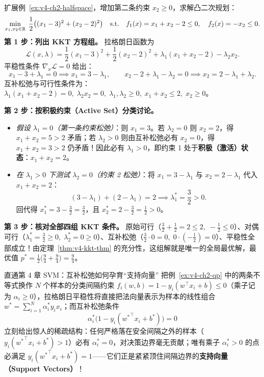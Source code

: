\begin{example}\label{ex:v4-ch2-qp}
扩展例~\ref{ex:v4-ch2-halfspace}，增加第二条约束 $x_2 \ge 0$，求解凸二次规划：
\[
  \min_{x_1, x_2 \in \mathbb{R}}\; \frac{1}{2}\big((x_1 - 3)^2 + (x_2 - 2)^2\big)
  \quad\text{s.t.}\quad f_1(x) = x_1 + x_2 - 2 \le 0,\quad f_2(x) = -x_2 \le 0.
\]
\textbf{第 1 步：列出 KKT 方程组。} 拉格朗日函数为
\[
  \mathcal{L}(x, \lambda) = \frac{1}{2}(x_1 - 3)^2 + \frac{1}{2}(x_2 - 2)^2 + \lambda_1(x_1 + x_2 - 2) - \lambda_2 x_2.
\]
平稳性条件 $\nabla_x \mathcal{L} = 0$ 给出：
\[
  x_1 - 3 + \lambda_1 = 0 \implies x_1 = 3 - \lambda_1, \qquad
  x_2 - 2 + \lambda_1 - \lambda_2 = 0 \implies x_2 = 2 - \lambda_1 + \lambda_2.
\]
互补松弛与可行性条件为：$\lambda_1(x_1 + x_2 - 2) = 0,\; \lambda_2 x_2 = 0,\; \lambda_1, \lambda_2 \ge 0,\; x_1 + x_2 \le 2,\; x_2 \ge 0$。

\textbf{第 2 步：按积极约束（Active Set）分类讨论。}
\begin{itemize}
  \item \emph{假设 $\lambda_1 = 0$（第一条约束松弛）}：则 $x_1 = 3$。若 $\lambda_2 = 0$ 则 $x_2 = 2$，得 $x_1 + x_2 = 5 > 2$ 矛盾；若 $\lambda_2 > 0$ 则由互补松弛必有 $x_2 = 0$，得 $x_1 + x_2 = 3 > 2$ 仍矛盾！因此必有 $\lambda_1 > 0$，即约束 1 处于\textbf{积极（激活）状态}：$x_1 + x_2 = 2$。
  \item \emph{在 $\lambda_1 > 0$ 下测试 $\lambda_2 = 0$（约束 2 松弛）}：将 $x_1 = 3 - \lambda_1$ 与 $x_2 = 2 - \lambda_1$ 代入 $x_1 + x_2 = 2$：
  \[
    (3 - \lambda_1) + (2 - \lambda_1) = 2 \implies \lambda_1^* = \frac{3}{2} > 0.
  \]
  回代得 $x_1^* = 3 - \frac{3}{2} = \frac{3}{2}$，且 $x_2^* = 2 - \frac{3}{2} = \frac{1}{2} > 0$。
\end{itemize}
\textbf{第 3 步：核对全部四组 KKT 条件。} 原始可行（$\frac{3}{2}+\frac{1}{2}=2\le 2,\; -\frac{1}{2}\le 0$）、对偶可行（$\lambda_1^*=\frac{3}{2}\ge 0,\; \lambda_2^*=0\ge 0$）、互补松弛（$\frac{3}{2}\cdot 0 = 0,\; 0\cdot(-\frac{1}{2})=0$）、平稳性全部成立！由定理~\ref{thm:v4-kkt-thm} 的充分性，这组解就是唯一的全局最优解，最优值 $p^* = \frac{1}{2}\big(\frac{9}{4}+\frac{9}{4}\big) = \frac{9}{4}$。
\end{example}

\begin{insightBox}{直通第 4 章 SVM：互补松弛如何孕育“支持向量”}
把例~\ref{ex:v4-ch2-qp} 中的两条不等式换作 $N$ 个样本的分类间隔约束 $f_i(w, b) = 1 - y_i(w^\top x_i + b) \le 0$（乘子记为 $\alpha_i \ge 0$），拉格朗日平稳性将直接把法向量表示为样本的线性组合 $w^* = \sum_{i=1}^N \alpha_i^* y_i x_i$；而互补松弛条件
\[
  \alpha_i^* \Big(1 - y_i({w^*}^\top x_i + b^*)\Big) = 0
\]
立刻给出惊人的稀疏结构：任何严格落在安全间隔之外的样本（$y_i({w^*}^\top x_i + b^*) > 1$）必有 $\alpha_i^* = 0$，对决策边界毫无贡献；唯有乘子 $\alpha_i^* > 0$ 的点必满足 $y_i({w^*}^\top x_i + b^*) = 1$——它们正是紧紧顶住间隔边界的\textbf{支持向量（Support Vectors）}！
\end{insightBox}

